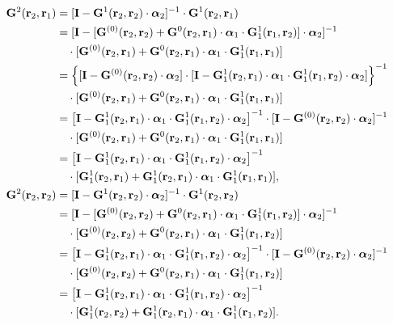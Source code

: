 \begin{subequations}
\begin{align}
\mathbf{G}^2(\mathbf{r}_2,\mathbf{r}_1)
&= [\mathbf{I}- \mathbf{G}^1(\mathbf{r}_2,\mathbf{r}_2) \cdot {\bm \alpha}_2]^{-1}\cdot \mathbf{G}^1(\mathbf{r}_2,\mathbf{r}_1)\nonumber \\
&=[\mathbf{I}- [\mathbf{G}^{(0)}(\mathbf{r}_2,\mathbf{r}_2)+\mathbf{G}^0(\mathbf{r}_2,\mathbf{r}_1)\cdot {\bm \alpha}_1\cdot \mathbf{G}^1_1(\mathbf{r}_1,\mathbf{r}_2)] \cdot {\bm \alpha}_2]^{-1}\nonumber \\
&\quad \cdot [\mathbf{G}^{(0)}(\mathbf{r}_2,\mathbf{r}_1)+\mathbf{G}^0(\mathbf{r}_2,\mathbf{r}_1)\cdot {\bm \alpha}_1\cdot \mathbf{G}^1_1(\mathbf{r}_1,\mathbf{r}_1)]\nonumber \\
&=\left\{ [\mathbf{I}- \mathbf{G}^{(0)}(\mathbf{r}_2,\mathbf{r}_2)\cdot {\bm \alpha}_2]\cdot [\mathbf{I}-\mathbf{G}^1_1(\mathbf{r}_2,\mathbf{r}_1)\cdot {\bm \alpha}_1\cdot \mathbf{G}^1_1(\mathbf{r}_1,\mathbf{r}_2) \cdot {\bm \alpha}_2]\right\}^{-1}\nonumber \\
&\quad \cdot [\mathbf{G}^{(0)}(\mathbf{r}_2,\mathbf{r}_1)+\mathbf{G}^0(\mathbf{r}_2,\mathbf{r}_1)\cdot {\bm \alpha}_1\cdot \mathbf{G}^1_1(\mathbf{r}_1,\mathbf{r}_1)]\nonumber \\
&=\left[\mathbf{I}-\mathbf{G}^1_1(\mathbf{r}_2,\mathbf{r}_1)\cdot {\bm \alpha}_1\cdot \mathbf{G}^1_1(\mathbf{r}_1,\mathbf{r}_2) \cdot {\bm \alpha}_2\right]^{-1}\cdot[\mathbf{I}- \mathbf{G}^{(0)}(\mathbf{r}_2,\mathbf{r}_2)\cdot {\bm \alpha}_2]^{-1}\nonumber \\
&\quad \cdot [\mathbf{G}^{(0)}(\mathbf{r}_2,\mathbf{r}_1)+\mathbf{G}^0(\mathbf{r}_2,\mathbf{r}_1)\cdot {\bm \alpha}_1\cdot \mathbf{G}^1_1(\mathbf{r}_1,\mathbf{r}_1)]\nonumber \\
&=\left[\mathbf{I}-\mathbf{G}^1_1(\mathbf{r}_2,\mathbf{r}_1)\cdot {\bm \alpha}_1\cdot \mathbf{G}^1_1(\mathbf{r}_1,\mathbf{r}_2) \cdot {\bm \alpha}_2\right]^{-1}\nonumber \\
&\quad \cdot [\mathbf{G}^1_1(\mathbf{r}_2,\mathbf{r}_1)+\mathbf{G}^1_1(\mathbf{r}_2,\mathbf{r}_1)\cdot {\bm \alpha}_1\cdot \mathbf{G}^1_1(\mathbf{r}_1,\mathbf{r}_1)], \label{G221_3}\\
\mathbf{G}^2(\mathbf{r}_2,\mathbf{r}_2)
&= [\mathbf{I}- \mathbf{G}^1(\mathbf{r}_2,\mathbf{r}_2) \cdot {\bm \alpha}_2]^{-1}\cdot \mathbf{G}^1(\mathbf{r}_2,\mathbf{r}_2)\nonumber \\
&=[\mathbf{I}- [\mathbf{G}^{(0)}(\mathbf{r}_2,\mathbf{r}_2)+\mathbf{G}^0(\mathbf{r}_2,\mathbf{r}_1)\cdot {\bm \alpha}_1\cdot \mathbf{G}^1_1(\mathbf{r}_1,\mathbf{r}_2)] \cdot {\bm \alpha}_2]^{-1}\nonumber \\
&\quad \cdot [\mathbf{G}^{(0)}(\mathbf{r}_2,\mathbf{r}_2)+\mathbf{G}^0(\mathbf{r}_2,\mathbf{r}_1)\cdot {\bm \alpha}_1\cdot \mathbf{G}^1_1(\mathbf{r}_1,\mathbf{r}_2)]\nonumber \\
&=\left[\mathbf{I}-\mathbf{G}^1_1(\mathbf{r}_2,\mathbf{r}_1)\cdot {\bm \alpha}_1\cdot \mathbf{G}^1_1(\mathbf{r}_1,\mathbf{r}_2) \cdot {\bm \alpha}_2\right]^{-1}\cdot[\mathbf{I}- \mathbf{G}^{(0)}(\mathbf{r}_2,\mathbf{r}_2)\cdot {\bm \alpha}_2]^{-1}\nonumber \\
&\quad \cdot [\mathbf{G}^{(0)}(\mathbf{r}_2,\mathbf{r}_2)+\mathbf{G}^0(\mathbf{r}_2,\mathbf{r}_1)\cdot {\bm \alpha}_1\cdot \mathbf{G}^1_1(\mathbf{r}_1,\mathbf{r}_2)]\nonumber \\
&=\left[\mathbf{I}-\mathbf{G}^1_1(\mathbf{r}_2,\mathbf{r}_1)\cdot {\bm \alpha}_1\cdot \mathbf{G}^1_1(\mathbf{r}_1,\mathbf{r}_2) \cdot {\bm \alpha}_2\right]^{-1}\nonumber \\
&\quad \cdot [\mathbf{G}^1_1(\mathbf{r}_2,\mathbf{r}_2)+\mathbf{G}^1_1(\mathbf{r}_2,\mathbf{r}_1)\cdot {\bm \alpha}_1\cdot \mathbf{G}^1_1(\mathbf{r}_1,\mathbf{r}_2)].\label{G222_3}
\end{align}
\end{subequations}
